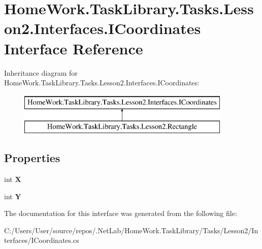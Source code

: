 \hypertarget{interface_home_work_1_1_task_library_1_1_tasks_1_1_lesson2_1_1_interfaces_1_1_i_coordinates}{}\section{Home\+Work.\+Task\+Library.\+Tasks.\+Lesson2.\+Interfaces.\+I\+Coordinates Interface Reference}
\label{interface_home_work_1_1_task_library_1_1_tasks_1_1_lesson2_1_1_interfaces_1_1_i_coordinates}
Inheritance diagram for Home\+Work.\+Task\+Library.\+Tasks.\+Lesson2.\+Interfaces.\+I\+Coordinates\+:\begin{figure}[H]
\begin{center}
\leavevmode
\includegraphics[height=2.000000cm]{interface_home_work_1_1_task_library_1_1_tasks_1_1_lesson2_1_1_interfaces_1_1_i_coordinates}
\end{center}
\end{figure}
\subsection*{Properties}
\begin{DoxyCompactItemize}
\item 
\mbox{\label{interface_home_work_1_1_task_library_1_1_tasks_1_1_lesson2_1_1_interfaces_1_1_i_coordinates_a7853beb0a0a4be1757e2cac2f727d762}} 
int {\bfseries X}
\item 
\mbox{\label{interface_home_work_1_1_task_library_1_1_tasks_1_1_lesson2_1_1_interfaces_1_1_i_coordinates_a585bdbc62b52cf455ee982d1d26053b6}} 
int {\bfseries Y}
\end{DoxyCompactItemize}


The documentation for this interface was generated from the following file\+:\begin{DoxyCompactItemize}
\item 
C\+:/\+Users/\+User/source/repos/.\+Net\+Lab/\+Home\+Work.\+Task\+Library/\+Tasks/\+Lesson2/\+Interfaces/I\+Coordinates.\+cs\end{DoxyCompactItemize}
